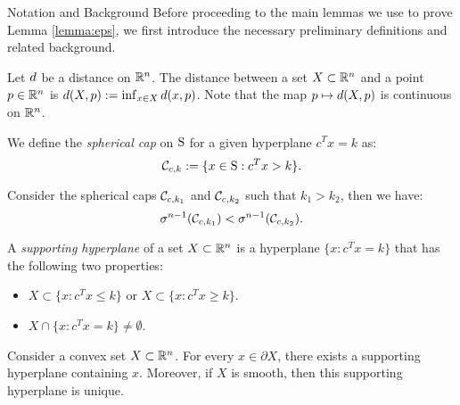 \begin{subsection}{Notation and Background}
Before proceeding to the main lemmas we use to prove Lemma \ref{lemma:eps}, we first introduce the necessary preliminary definitions and related background.

Let $d$ be a distance on $\mathbb{R}^n$. The distance between a set $X \subset \mathbb{R}^n$ and a point $p \in \mathbb{R}^n$ is $d(X, p):=\inf_{x \in X}d(x,p)$. Note that the map $p \mapsto d(X,p)$ is continuous on $\mathbb{R}^n$.

\begin{definition}%
We define the \emph{spherical cap} on $\text{S}$ for a given hyperplane $c^Tx = k$ as:
\begin{equation*}\mathcal{C}_{c,k} := \{x \in \text{S} : c^Tx >k\}.\end{equation*}
\end{definition}

\begin{remark}\label{lemma:muMonotone}Consider the spherical caps $\mathcal{C}_{c, k_1}$ and $\mathcal{C}_{c, k_2}$ such that $k_1 > k_2$, then we have:
$$\sigma^{n-1}(\mathcal{C}_{c,k_1}) < \sigma^{n-1}(\mathcal{C}_{c,k_2}).$$
\end{remark}


\begin{definition}A \emph{supporting hyperplane} of a set $X \subset \mathbb{R}^n$ is a hyperplane $\{x:c^Tx = k\}$ that has the following two properties:
\begin{itemize}
\item $X \subset \{x: c^Tx \leq k\}$ or $X \subset \{x: c^Tx \geq k\}$.
\item $X \cap \{x: c^Tx = k\} \not= \emptyset$.
\end{itemize}
\end{definition}

\begin{remark}\label{suppHyperplaneRemark}\cite{boyd} Consider a convex set $X \subset \mathbb{R}^n$. For every $x \in \partial X$, there exists a supporting hyperplane containing $x$. Moreover, if $X$ is smooth, then this supporting hyperplane is unique.
\end{remark}


\end{subsection}
